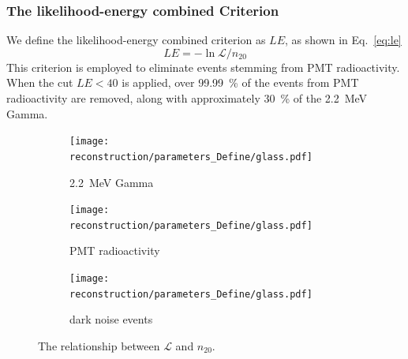 \subsubsection{The likelihood-energy combined Criterion}
We define the likelihood-energy combined criterion as $LE$, as shown in Eq.~\eqref{eq:le}
\begin{equation}
	LE = -\ln \mathcal{L}/n_{20}
	\label{eq:le}
\end{equation}
This criterion is employed to eliminate events stemming from PMT radioactivity. When the cut $LE < 40$ is applied, over \SI{99.99}{\%} of the events from PMT radioactivity are removed, along with approximately \SI{30}{\%} of the \SI{2.2}{MeV} Gamma.
\begin{figure}[htbp]
	\centering
	\begin{subfigure}{0.5\textwidth} %
		\centering
		\texttt{[image: reconstruction/parameters\_Define/glass.pdf]}
		\caption{\SI{2.2}{MeV} Gamma}
		\label{fig:glass3}
	\end{subfigure}%
	\hfill
	\begin{subfigure}{0.5\textwidth}
		\centering
		\texttt{[image: reconstruction/parameters\_Define/glass.pdf]}
		\caption{PMT radioactivity}
		\label{fig:glass6}
	\end{subfigure}%
	\hfill
	\begin{subfigure}{0.5\textwidth}
		\centering
		\texttt{[image: reconstruction/parameters\_Define/glass.pdf]}
		\caption{dark noise events}
		\label{fig:glass9}
	\end{subfigure}
	\caption{The relationship between $\mathcal{L}$ and $n_{20}$.}
	\label{fig:glass_all}
\end{figure}

